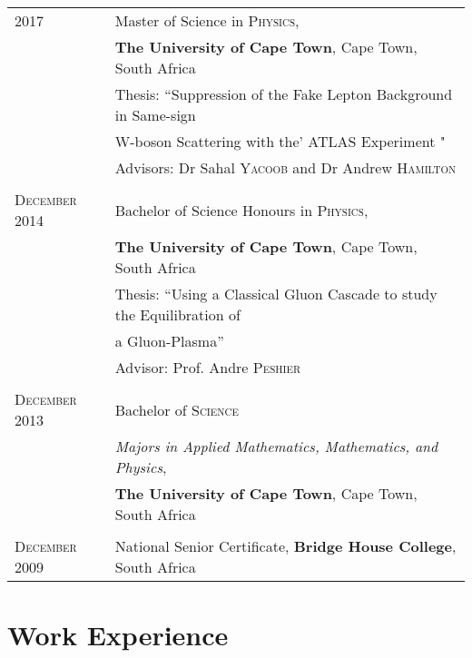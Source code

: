 \documentclass[a4paper,10pt]{article} %
\begin{document}
\begin{tabular}{ll}

\textsc{2017} & Master of Science in \textsc{Physics}, \\ & \textbf{The University of Cape Town}, Cape Town, South Africa\\
& Thesis: ``Suppression of the Fake Lepton Background in Same-sign\\ & W-boson Scattering with the' ATLAS Experiment " \\ & \small Advisors: Dr Sahal \textsc{Yacoob} and Dr Andrew \textsc{Hamilton}\\
&\\

	
\textsc{December} 2014 & Bachelor of Science Honours in \textsc{Physics}, \\ & \textbf{The University of Cape Town}, Cape Town, South Africa\\
& Thesis: ``Using a Classical Gluon Cascade to study the Equilibration of \\ & a Gluon-Plasma'' \\ & \small Advisor: Prof. Andre \textsc{Peshier}\\
&\\


\textsc{December} 2013 & Bachelor of  \textsc{}\textsc{Science} \\& \small\emph{Majors in Applied Mathematics, Mathematics, and Physics}, \\ & \normalsize\textbf{The University of Cape Town}, Cape Town, South Africa\\
&\\


\textsc{December} 2009 & National Senior Certificate, \textbf{Bridge House College}, South Africa
\end{tabular}


\section{Work Experience}
\end{document}
